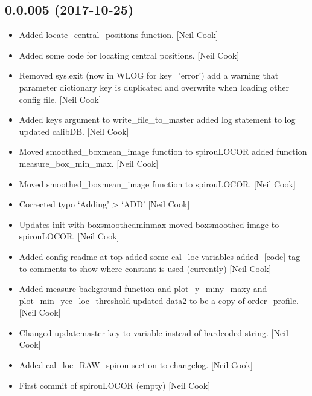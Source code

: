 \documentclass[a4paper,10pt,english]{report}
\begin{document}
\subsection{0.0.005 (2017-10-25)}
\label{\detokenize{misc/changelog:id544}}\begin{itemize}
\item {} 
Added locate\_central\_positions function. {[}Neil Cook{]}

\item {} 
Added some code for locating central positions. {[}Neil Cook{]}

\item {} 
Removed sys.exit (now in WLOG for key=’error’) add a warning that
parameter dictionary key is duplicated and overwrite when loading
other config file. {[}Neil Cook{]}

\item {} 
Added keys argument to write\_file\_to\_master added log statement to log
updated calibDB. {[}Neil Cook{]}

\item {} 
Moved smoothed\_boxmean\_image function to spirouLOCOR added function
measure\_box\_min\_max. {[}Neil Cook{]}

\item {} 
Moved smoothed\_boxmean\_image function to spirouLOCOR. {[}Neil Cook{]}

\item {} 
Corrected typo ‘Adding’ \textendash{}\textgreater{} ‘ADD’ {[}Neil Cook{]}

\item {} 
Updates init with boxsmoothedminmax moved boxsmoothed image to
spirouLOCOR. {[}Neil Cook{]}

\item {} 
Added config readme at top added some cal\_loc variables added -{[}code{]}
tag to comments to show where constant is used (currently) {[}Neil Cook{]}

\item {} 
Added measure background function and plot\_y\_miny\_maxy and
plot\_min\_ycc\_loc\_threshold updated data2 to be a copy of
order\_profile. {[}Neil Cook{]}

\item {} 
Changed updatemaster key to variable instead of hardcoded string.
{[}Neil Cook{]}

\item {} 
Added cal\_loc\_RAW\_spirou section to changelog. {[}Neil Cook{]}

\item {} 
First commit of spirouLOCOR (empty) {[}Neil Cook{]}


\end{itemize}
\end{document}
